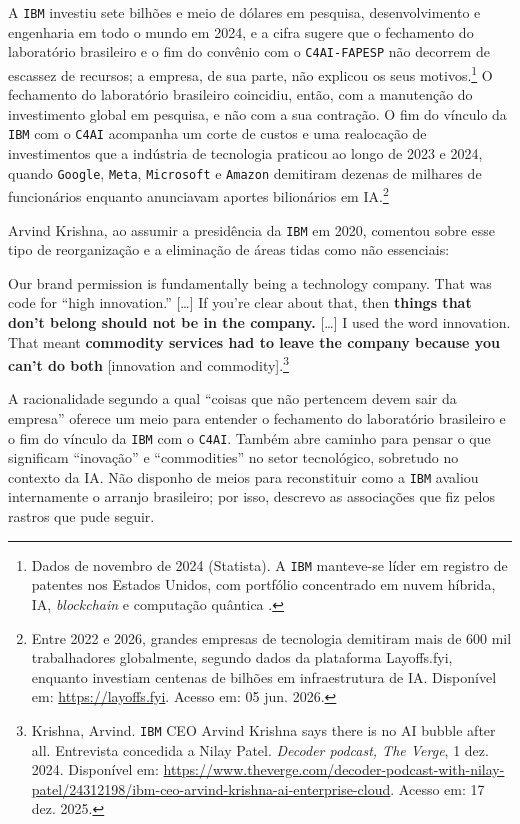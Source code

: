 A \texttt{IBM} investiu sete bilhões e meio de dólares em pesquisa, desenvolvimento e engenharia em todo o mundo em 2024, e a cifra sugere que o fechamento do laboratório brasileiro e o fim do convênio com o \texttt{C4AI-FAPESP} não decorrem de escassez de recursos; a empresa, de sua parte, não explicou os seus motivos.\footnote{Dados de novembro de 2024 (Statista). A \texttt{IBM} manteve-se líder em registro de patentes nos Estados Unidos, com portfólio concentrado em nuvem híbrida, IA, \emph{blockchain} e computação quântica \parencite{Taylor2024IBMResearch}.} O fechamento do laboratório brasileiro coincidiu, então, com a manutenção do investimento global em pesquisa, e não com a sua contração. O fim do vínculo da \texttt{IBM} com o \texttt{C4AI} acompanha um corte de custos e uma realocação de investimentos que a indústria de tecnologia praticou ao longo de 2023 e 2024, quando \texttt{Google}, \texttt{Meta}, \texttt{Microsoft} e \texttt{Amazon} demitiram dezenas de milhares de funcionários enquanto anunciavam aportes bilionários em IA.\footnote{Entre 2022 e 2026, grandes empresas de tecnologia demitiram mais de 600 mil trabalhadores globalmente, segundo dados da plataforma Layoffs.fyi, enquanto investiam centenas de bilhões em infraestrutura de IA. Disponível em: \url{https://layoffs.fyi}. Acesso em: 05 jun. 2026.}

Arvind Krishna, ao assumir a presidência da \texttt{IBM} em 2020, comentou sobre esse tipo de reorganização e a eliminação de áreas tidas como não essenciais:
\begin{citacaoabnt}
Our brand permission is fundamentally being a technology company. That was code for ``high innovation.'' [\ldots{}] If you're clear about that, then \textbf{things that don't belong should not be in the company.} [\ldots{}] I used the word innovation. That meant \textbf{commodity services had to leave the company because you can't do both} [innovation and commodity].\footnote{Krishna, Arvind. \texttt{IBM} CEO Arvind Krishna says there is no AI bubble after all. Entrevista concedida a Nilay Patel. \textit{Decoder podcast, The Verge}, 1 dez. 2024. Disponível em: \url{https://www.theverge.com/decoder-podcast-with-nilay-patel/24312198/ibm-ceo-arvind-krishna-ai-enterprise-cloud}. Acesso em: 17 dez. 2025.}
\end{citacaoabnt} A racionalidade segundo a qual \enquote{coisas que não pertencem devem sair da empresa} oferece um meio para entender o fechamento do laboratório brasileiro e o fim do vínculo da \texttt{IBM} com o \texttt{C4AI}. Também abre caminho para pensar o que significam \enquote{inovação} e \enquote{commodities} no setor tecnológico, sobretudo no contexto da IA. Não disponho de meios para reconstituir como a \texttt{IBM} avaliou internamente o arranjo brasileiro; por isso, descrevo as associações que fiz pelos rastros que pude seguir.

